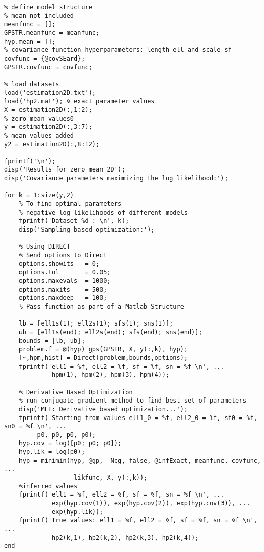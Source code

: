 \begin{verbatim}
% define model structure
% mean not included
meanfunc = [];
GPSTR.meanfunc = meanfunc;
hyp.mean = [];
% covariance function hyperparameters: length ell and scale sf
covfunc = {@covSEard};
GPSTR.covfunc = covfunc;

% load datasets
load('estimation2D.txt');
load('hp2.mat'); % exact parameter values
X = estimation2D(:,1:2);
% zero-mean values0
y = estimation2D(:,3:7);
% mean values added
y2 = estimation2D(:,8:12);

fprintf('\n');
disp('Results for zero mean 2D');
disp('Covariance parameters maximizing the log likelihood:');

for k = 1:size(y,2)
    % To find optimal parameters
    % negative log likelihoods of different models
    fprintf('Dataset %d : \n', k);
    disp('Sampling based optimization:');

    % Using DIRECT
    % Send options to Direct
    options.showits   = 0;
    options.tol       = 0.05;
    options.maxevals  = 1000;
    options.maxits    = 500;
    options.maxdeep   = 100;
    % Pass function as part of a Matlab Structure

    lb = [ell1s(1); ell2s(1); sfs(1); sns(1)];
    ub = [ell1s(end); ell2s(end); sfs(end); sns(end)];
    bounds = [lb, ub];
    problem.f = @(hyp) gps(GPSTR, X, y(:,k), hyp);
    [~,hpm,hist] = Direct(problem,bounds,options);
    fprintf('ell1 = %f, ell2 = %f, sf = %f, sn = %f \n', ...
             hpm(1), hpm(2), hpm(3), hpm(4));

    % Derivative Based Optimization
    % run conjugate gradient method to find best set of parameters
    disp('MLE: Derivative based optimization...');
    fprintf('Starting from values ell1_0 = %f, ell2_0 = %f, sf0 = %f, sn0 = %f \n', ...
         p0, p0, p0, p0);
    hyp.cov = log([p0; p0; p0]);
    hyp.lik = log(p0);
    hyp = minimin(hyp, @gp, -Ncg, false, @infExact, meanfunc, covfunc, ...
                   likfunc, X, y(:,k));
    %inferred values
    fprintf('ell1 = %f, ell2 = %f, sf = %f, sn = %f \n', ...
             exp(hyp.cov(1)), exp(hyp.cov(2)), exp(hyp.cov(3)), ...
             exp(hyp.lik));
    fprintf('True values: ell1 = %f, ell2 = %f, sf = %f, sn = %f \n', ...
             hp2(k,1), hp2(k,2), hp2(k,3), hp2(k,4));
end
\end{verbatim}


